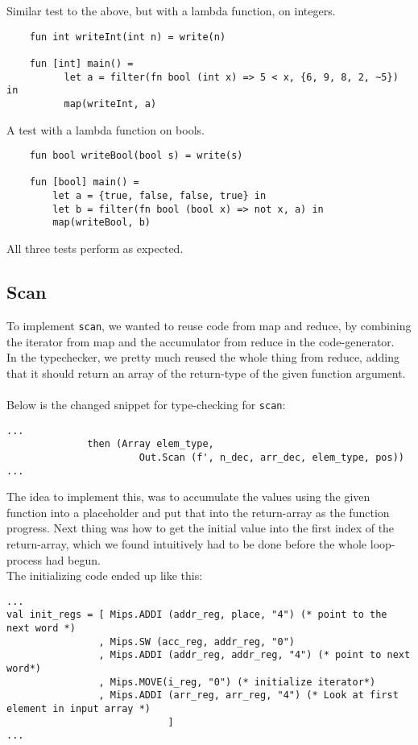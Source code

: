 \documentclass[paper=a4, fontsize=11pt]{scrartcl} %
\numberwithin{equation}{section} %
\numberwithin{figure}{section} %
\numberwithin{table}{section} %
\begin{document}
	Similar test to the above, but with a lambda function, on integers.
	\begin{lstlisting}
	fun int writeInt(int n) = write(n)

	fun [int] main() =
		  let a = filter(fn bool (int x) => 5 < x, {6, 9, 8, 2, ~5}) in
		  map(writeInt, a)
	\end{lstlisting}

	A test with a lambda function on bools.
	\begin{lstlisting}
	fun bool writeBool(bool s) = write(s)

	fun [bool] main() =
		let a = {true, false, false, true} in
		let b = filter(fn bool (bool x) => not x, a) in
		map(writeBool, b)
	\end{lstlisting}

	All three tests perform as expected.
\subsection{Scan}
To implement \verb"scan", we wanted to reuse code from map and reduce, by combining the iterator from map and the accumulator from reduce in the code-generator.\\
In the typechecker, we pretty much reused the whole thing from reduce, adding that it should return an array of the return-type of the given function argument.\\\\
Below is the changed snippet for type-checking for \verb"scan":
\begin{lstlisting}
...
              then (Array elem_type,
                       Out.Scan (f', n_dec, arr_dec, elem_type, pos))
...
\end{lstlisting}

The idea to implement this, was to accumulate the values using the given function into a placeholder and put that into the return-array as the function progress. Next thing was how to get the initial value into the first index of the return-array, which we found intuitively had to be done before the whole loop-process had begun.\\
The initializing code ended up like this:
\begin{lstlisting}
...
val init_regs = [ Mips.ADDI (addr_reg, place, "4") (* point to the next word *)
                , Mips.SW (acc_reg, addr_reg, "0")
                , Mips.ADDI (addr_reg, addr_reg, "4") (* point to next word*)
                , Mips.MOVE(i_reg, "0") (* initialize iterator*)
                , Mips.ADDI (arr_reg, arr_reg, "4") (* Look at first element in input array *)
                            ]
...
\end{lstlisting}
\end{document}
